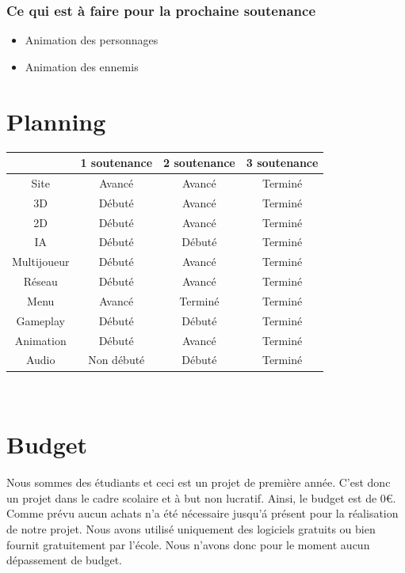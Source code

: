 \documentclass[a4paper, 12pt]{article}
\begin{document}
\subsubsection*{Ce qui est à faire pour la prochaine soutenance}
\begin{itemize}
\item Animation des personnages
\item Animation des ennemis
\end{itemize}

\section{Planning}
	\begin{tabular}{|c||c|c|c|}
		\hline
		& 1\iere{} soutenance & 2\ieme{} soutenance & 3\ieme{} soutenance \\
		\hline
		Site &  Avancé & Avancé & Terminé \\
		\hline
		3D & Débuté & Avancé & Terminé \\
		\hline
		2D & Débuté & Avancé & Terminé \\
		\hline
		IA & Débuté & Débuté & Terminé\\
		\hline
		Multijoueur & Débuté & Avancé & Terminé\\
		\hline
		Réseau & Débuté & Avancé & Terminé\\
		\hline
		Menu & Avancé & Terminé & Terminé \\
		\hline
		Gameplay & Débuté & Débuté & Terminé\\
		\hline
		Animation & Débuté & Avancé & Terminé\\		
		\hline
		Audio & Non débuté & Débuté & Terminé\\
		\hline		
	\end{tabular}\\
	\newpage
\section{Budget}

Nous sommes des étudiants et ceci est un projet de première année. C'est donc un projet dans le cadre scolaire et à but non lucratif. Ainsi, le budget est de 0\euro{}. Comme prévu aucun achats n'a été nécessaire jusqu'\'a présent pour la réalisation de notre projet. Nous avons utilisé uniquement des logiciels gratuits ou bien fournit gratuitement par l'école. Nous n'avons donc pour le moment aucun dépassement de budget.\\
\end{document}

